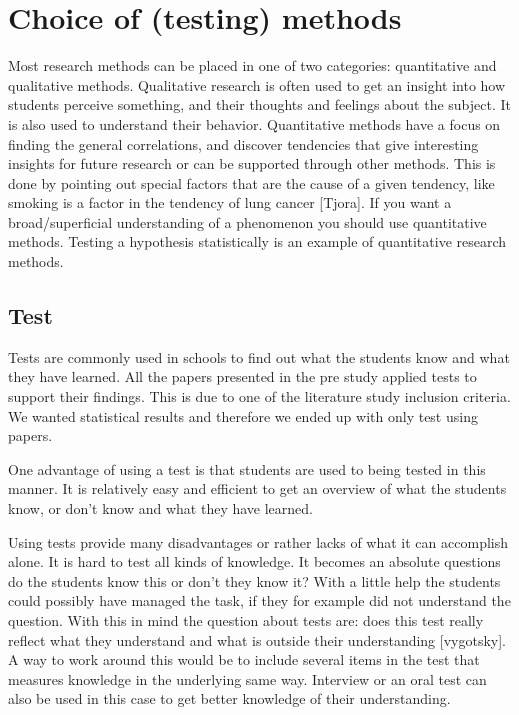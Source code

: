 \chapter{Choice of (testing) methods}
Most research methods can be placed in one of two categories: quantitative and qualitative methods. Qualitative research is often used to get an insight into how students perceive something, and their thoughts and feelings about the subject. It is also used to understand their behavior. Quantitative methods have a focus on finding the general correlations, and discover tendencies that give interesting insights for future research or can be supported through other methods. This is done by pointing out special factors that are the cause of a given tendency, like smoking is a factor in the tendency of lung cancer [Tjora]. If you want a broad/superficial understanding of a phenomenon you should use quantitative methods. Testing a hypothesis statistically is an example of quantitative research methods. 

\section{Test}
Tests are commonly used  in schools to find out what the students know and what they have learned. All the papers presented in the pre study applied tests to support their findings. This is due to one of the literature study inclusion criteria. We wanted statistical results and therefore we ended up with only test using papers. 

\bigskip\noindent
One advantage of using a test is that students are used to being tested in this manner. It is relatively easy and efficient to get an overview of what the students know, or don't know and what they have learned.

\bigskip\noindent
Using tests provide many disadvantages or rather lacks of what it can accomplish alone. It is hard to test all kinds of knowledge. It becomes an absolute questions do the students know this or don't they know it? With a little help the students could possibly have managed the task, if they for example did not understand the question. With this in mind the question about tests are: does this test really reflect what they understand and what is outside their understanding [vygotsky]. A way to work around this would be to include several items in the test that measures knowledge in the underlying same way. Interview or an oral test can also be used in this case to get better knowledge of their understanding.

